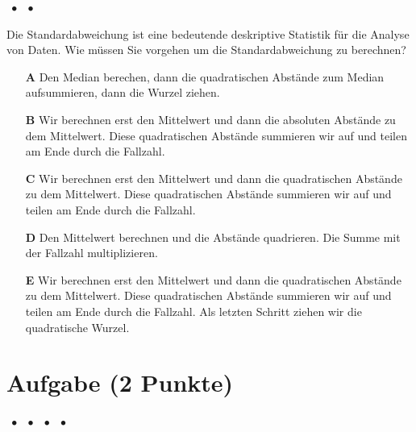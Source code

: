 \documentclass[a4paper, 9pt]{scrartcl}\usepackage[]{graphicx}\usepackage[]{xcolor}
\begin{document}
\ifcollection
\begin{flushright}
\tiny\vspace{-2Ex}
\textbf{\examinhaltstart}
\exammodulemathstat $\;\bullet$
\exammodulestat $\;\bullet$
\exammodulestatbbv 
\vspace{-1Ex}
\end{flushright}
\fi




Die Standardabweichung ist eine bedeutende deskriptive Statistik für die Analyse von Daten. Wie müssen Sie vorgehen um die Standardabweichung zu berechnen?



\begin{enumerate}
\item [\textbf{A} \msquare] Den Median berechen, dann die quadratischen Abstände zum Median aufsummieren, dann die Wurzel ziehen.
\item [\textbf{B} \msquare] Wir berechnen erst den Mittelwert und dann die absoluten Abstände zu dem Mittelwert. Diese quadratischen Abstände summieren wir auf und teilen am Ende durch die Fallzahl.
\item [\textbf{C} \msquare] Wir berechnen erst den Mittelwert und dann die quadratischen Abstände zu dem Mittelwert. Diese quadratischen Abstände summieren wir auf und teilen am Ende durch die Fallzahl.
\item [\textbf{D} \msquare] Den Mittelwert berechnen und die Abstände quadrieren. Die Summe mit der Fallzahl multiplizieren.
\item [\textbf{E} \msquare] Wir berechnen erst den Mittelwert und dann die quadratischen Abstände zu dem Mittelwert. Diese quadratischen Abstände summieren wir auf und teilen am Ende durch die Fallzahl. Als letzten Schritt ziehen wir die quadratische Wurzel.
\end{enumerate} 

\section{Aufgabe \hfill (2 Punkte)}

\ifcollection
\begin{flushright}
\tiny\vspace{-2Ex}
\textbf{\examinhaltstart}
\exammodulemathstat $\;\bullet$
\exammodulestat $\;\bullet$
\exammodulestatbbv $\;\bullet$
\exammodulestatversuch $\;\bullet$
\exammodulebiostat
\vspace{-1Ex}
\end{flushright}
\fi
\end{document}
